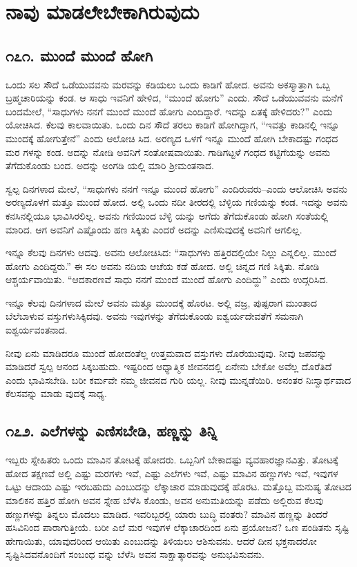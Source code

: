 
\chapter{ನಾವು ಮಾಡಲೇಬೇಕಾಗಿರುವುದು}

\section{\num{೧೭೧. } ಮುಂದೆ ಮುಂದೆ ಹೋಗಿ}

ಒಂದು ಸಲ ಸೌದೆ ಒಡೆಯುವವನು ಮರವನ್ನು ಕಡಿಯಲು ಒಂದು ಕಾಡಿಗೆ ಹೋದ. ಅವನು ಅಕಸ್ಮಾತ್ತಾಗಿ ಒಬ್ಬ ಬ್ರಹ್ಮಚಾರಿಯನ್ನು ಕಂಡ. ಆ ಸಾಧು ಇವನಿಗೆ ಹೇಳಿದ, “ಮುಂದೆ ಹೋಗು” ಎಂದು. ಸೌದೆ ಒಡೆಯುವವನು ಮನೆಗೆ ಬಂದಮೇಲೆ, “ಸಾಧುಗಳು ನನಗೆ ಮುಂದೆ ಮುಂದೆ ಹೋಗು ಎಂದಿದ್ದಾರೆ. ಇದನ್ನು ಏತಕ್ಕೆ ಹೇಳಿದರು?” ಎಂದು ಯೋಚಿಸಿದ. ಕೆಲವು ಕಾಲವಾಯಿತು. ಒಂದು ದಿನ ಸೌದೆ ತರಲು ಕಾಡಿಗೆ ಹೋಗಿದ್ದಾಗ, “ಇವತ್ತು ಕಾಡಿನಲ್ಲಿ ಇನ್ನೂ ಮುಂದಕ್ಕೆ ಹೋಗುತ್ತೇನೆ” ಎಂದು ಆಲೋಚಿ ಸಿದ. ಅರಣ್ಯದ ಒಳಗೆ ಇನ್ನೂ ಮುಂದೆ ಹೋಗಿ ಬೇಕಾದಷ್ಟು ಗಂಧದ ಮರ ಗಳನ್ನು ಕಂಡ. ಅದನ್ನು ನೋಡಿ ಅವನಿಗೆ ಸಂತೋಷವಾಯಿತು. ಗಾಡಿಗಟ್ಟಳೆ ಗಂಧದ ಕಟ್ಟಿಗೆಯನ್ನು ಅವನು ತೆಗೆದುಕೊಂಡು ಬಂದ. ಅದನ್ನು ಅಂಗಡಿ ಯಲ್ಲಿ ಮಾರಿ ಶ್ರೀಮಂತನಾದ.

ಸ್ವಲ್ಪ ದಿನಗಳಾದ ಮೇಲೆ, “ಸಾಧುಗಳು ನನಗೆ ಇನ್ನೂ ಮುಂದೆ ಹೋಗು” ಎಂದಿರುವರು–ಎಂದು ಆಲೋಚಿಸಿ ಅವನು ಅರಣ್ಯದೊಳಗೆ ಮತ್ತೂ ಮುಂದೆ ಹೋದ. ಅಲ್ಲಿ ಒಂದು ನದೀ ತೀರದಲ್ಲಿ ಬೆಳ್ಳಿಯ ಗಣಿಯನ್ನು ಕಂಡ. ಇದನ್ನು ಅವನು ಕನಸಿನಲ್ಲಿಯೂ ಭಾವಿಸಿರಲಿಲ್ಲ. ಅವನು ಗಣಿಯಿಂದ ಬೆಳ್ಳಿ ಯನ್ನು ಅಗೆದು ತೆಗೆದುಕೊಂಡು ಹೋಗಿ ಸಂತೆಯಲ್ಲಿ ಮಾರಿದ. ಆಗ ಅವನಿಗೆ ಎಷ್ಟೊಂದು ಹಣ ಸಿಕ್ಕಿತು ಎಂದರೆ ಅದನ್ನು ಎಣಿಸುವುದಕ್ಕೆ ಅವನಿಗೆ ಆಗಲಿಲ್ಲ.

ಇನ್ನೂ ಕೆಲವು ದಿನಗಳು ಆದವು. ಅವನು ಆಲೋಚಿಸಿದ: “ಸಾಧುಗಳು ಹತ್ತಿರದಲ್ಲಿಯೇ ನಿಲ್ಲು ಎನ್ನಲಿಲ್ಲ. ಮುಂದೆ ಹೋಗು ಎಂದಿದ್ದರು.” ಈ ಸಲ ಅವನು ನದಿಯ ಆಚೆಯ ಕಡೆ ಹೋದ. ಅಲ್ಲಿ ಚಿನ್ನದ ಗಣಿ ಸಿಕ್ಕಿತು. ನೋಡಿ ಆಶ್ಚರ್ಯವಾಯಿತು. “ಆದಕಾರಣವೆ ಸಾಧು ನನಗೆ ಮುಂದೆ ಮುಂದೆ ಹೋಗು ಎಂದಿದ್ದು” ಎಂದು ಉದ್ಗರಿಸಿದ.

ಇನ್ನೂ ಕೆಲವು ದಿನಗಳಾದ ಮೇಲೆ ಅವನು ಮತ್ತೂ ಮುಂದಕ್ಕೆ ಹೊರಟ. ಅಲ್ಲಿ ವಜ್ರ, ಪುಷ್ಪರಾಗ ಮುಂತಾದ ಬೆಲೆಬಾಳುವ ವಸ್ತುಗಳುಸಿಕ್ಕಿದವು. ಅವನು ಇವುಗಳನ್ನು ತೆಗೆದುಕೊಂಡು ಐಶ್ವರ್ಯದೇವತೆಗೆ ಸಮನಾಗಿ ಐಶ್ವರ್ಯವಂತನಾದ.

ನೀವು ಏನು ಮಾಡಿದರೂ ಮುಂದೆ ಹೋದಂತೆಲ್ಲ ಉತ್ತಮವಾದ ವಸ್ತುಗಳು ದೊರೆಯುವುವು. ನೀವು ಜಪವನ್ನು ಮಾಡಿದರೆ ಸ್ವಲ್ಪ ಆನಂದ ಸಿಕ್ಕಬಹುದು. ಇಷ್ಟರಿಂದ ಆಧ್ಯಾತ್ಮಿಕ ಜೀವನದಲ್ಲಿ ಏನೇನು ಬೇಕೋ ಅವೆಲ್ಲ ದೊರೆತಿದೆ ಎಂದು ಭಾವಿಸಬೇಡಿ. ಬರೀ ಕರ್ಮವೇ ನಮ್ಮ ಜೀವನದ ಗುರಿ ಯಲ್ಲ. ನೀವು ಮುನ್ನಡೆಯಿರಿ. ಅನಂತರ ನಿಃಸ್ವಾರ್ಥವಾದ ಕೆಲಸವನ್ನು ಮಾಡು ವುದಕ್ಕೆ ಸಾಧ್ಯ.


\section{\num{೧೭೨. } ಎಲೆಗಳನ್ನು ಎಣಿಸಬೇಡಿ, ಹಣ್ಣನ್ನು ತಿನ್ನಿ}

ಇಬ್ಬರು ಸ್ನೇಹಿತರು ಒಂದು ಮಾವಿನ ತೋಟಕ್ಕೆ ಹೋದರು. ಒಬ್ಬನಿಗೆ ಬೇಕಾದಷ್ಟು ವ್ಯವಹಾರಜ್ಞಾನವಿತ್ತು. ತೋಟಕ್ಕೆ ಹೋದ ತಕ್ಷಣವೆ ಅಲ್ಲಿ ಎಷ್ಟು ಮರಗಳು ಇವೆ, ಎಷ್ಟು ಎಲೆಗಳು ಇವೆ, ಎಷ್ಟು ಮಾವಿನ ಹಣ್ಣುಗಳು ಇವೆ, ಇವುಗಳ ಒಟ್ಟು ಆದಾಯ ಎಷ್ಟು ಇರಬಹುದು ಎಂಬುದನ್ನು ಲೆಕ್ಕಾಚಾರ ಮಾಡುವುದಕ್ಕೆ ಹೊರಟ. ಮತ್ತೊಬ್ಬ ಮನುಷ್ಯ ತೋಟದ ಮಾಲಿಕನ ಹತ್ತಿರ ಹೋಗಿ ಅವನ ಸ್ನೇಹ ಬೆಳೆಸಿ ಕೊಂಡು, ಅವನ ಅನುಮತಿಯನ್ನು ಪಡೆದು ಅಲ್ಲಿರುವ ಕೆಲವು ಹಣ್ಣುಗಳನ್ನು ತಿನ್ನಲು ಮೊದಲು ಮಾಡಿದ. ಇವರಿಬ್ಬರಲ್ಲಿ ಯಾರು ಬುದ್ಧಿ ವಂತರು? ಮಾವಿನ ಹಣ್ಣನ್ನು ತಿಂದರೆ ಹಸಿವಿನಿಂದ ಪಾರಾಗುತ್ತೀಯೆ. ಬರೀ ಎಲೆ ಮರ ಇವುಗಳ ಲೆಕ್ಕಾಚಾರದಿಂದ ಏನು ಪ್ರಯೋಜನ? ಒಣ ಪಂಡಿತನು ಸೃಷ್ಟಿ ಹೇಗಾಯಿತು, ಯಾವುದರಿಂದ ಆಯಿತು ಎಂಬುದನ್ನು ತಿಳಿಯಲು ಆಶಿಸುವನು. ಆದರೆ ದೀನ ಭಕ್ತನಾದರೋ ಸೃಷ್ಟಿಸಿದವನೊಂದಿಗೆ ಸಂಬಂಧ ವನ್ನು ಬೆಳೆಸಿ ಅವನ ಸಾಕ್ಷಾತ್ಕಾರವನ್ನು ಅನುಭವಿಸುವನು.


